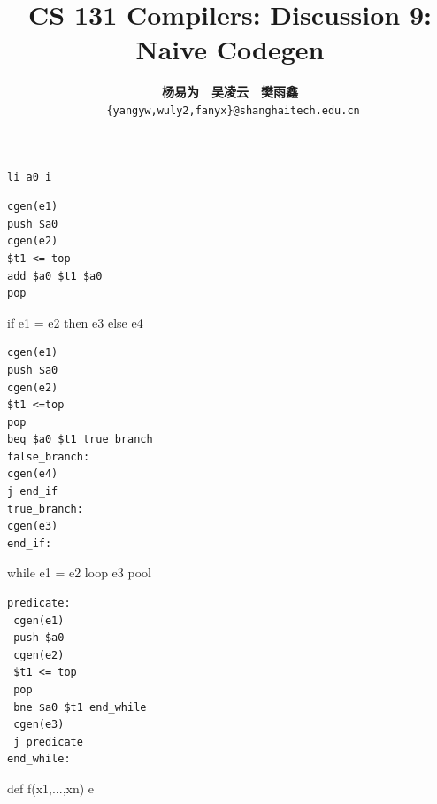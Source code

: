 \documentclass[a4paper]{exam}
\title{CS 131 Compilers: Discussion 9: Naive Codegen}
\author{\textbf{杨易为}~~\textbf{吴凌云}~~\textbf{樊雨鑫} \\ \texttt{ \{yangyw,wuly2,fanyx\}@shanghaitech.edu.cn}}
\theoremstyle{definition}
\begin{document}
\begin{lrbox}{\mybox}\begin{minipage}[t]{1.5in}
  \begin{verbatim}
li a0 i
  \end{verbatim}
\end{minipage}\end{lrbox}

\begin{lrbox}{\myboxa}\begin{minipage}[t]{1.5in}
  \begin{verbatim}
cgen(e1)
push $a0
cgen(e2)
$t1 <= top
add $a0 $t1 $a0
pop
  \end{verbatim}
\end{minipage}\end{lrbox}

\begin{lrbox}{\mybob}\begin{minipage}[t]{1in}
 if e1 = e2 then e3 else e4
\end{minipage}\end{lrbox}

\begin{lrbox}{\myboxb}\begin{minipage}[t]{1.5in}
  \begin{verbatim}
cgen(e1)
push $a0
cgen(e2)
$t1 <=top
pop
beq $a0 $t1 true_branch
false_branch:
cgen(e4)
j end_if
true_branch:
cgen(e3)
end_if:
  \end{verbatim}
\end{minipage}\end{lrbox}

\begin{lrbox}{\myboc}\begin{minipage}[t]{1in}
while e1 = e2 loop e3 pool
\end{minipage}\end{lrbox}

\begin{lrbox}{\myboxc}\begin{minipage}[t]{1.5in}
  \begin{verbatim}
predicate:
 cgen(e1)
 push $a0
 cgen(e2)
 $t1 <= top
 pop
 bne $a0 $t1 end_while
 cgen(e3)
 j predicate
end_while:
  \end{verbatim}
\end{minipage}\end{lrbox}
\begin{lrbox}{\mybod}\begin{minipage}[t]{1in}
def f(x1,...,xn) {e}
\end{minipage}\end{lrbox}
\end{document}
